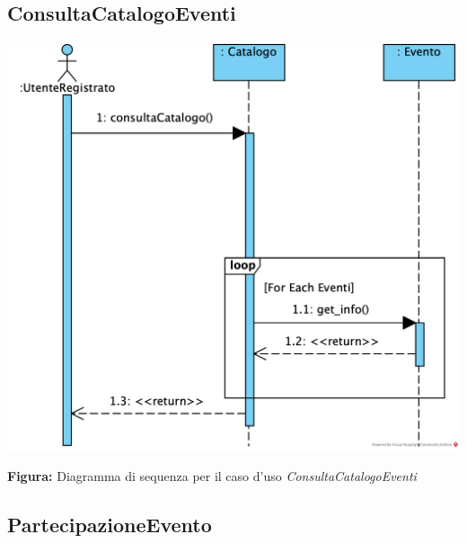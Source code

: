 {\small
\subsection{ConsultaCatalogoEventi}

\begin{center}

\includegraphics[height=0.38\textheight]{assets/casid'uso/ConsultaCatalogoEventi.png}

\vspace{1ex}
\textbf{Figura:} Diagramma di sequenza per il caso d’uso \textit{ConsultaCatalogoEventi}
\end{center}
}
\newpage
\subsection{PartecipazioneEvento}

